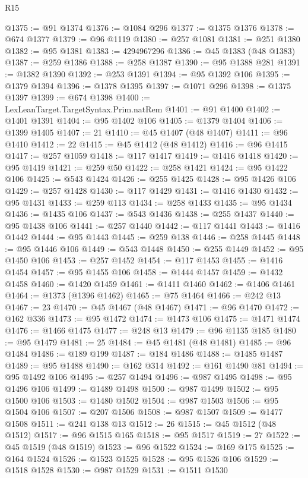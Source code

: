 \begin{lexlean}{R15}
\begin{coremodule}
{{{{{{{{{{{{{{{{{{{{{{{{{{{{{{{{{{{{{{{{{{{{{{{{{{{{{{{{{{{{{{{{{{{{{{@1375 := @91 @1374
@1376 := @1084 @296
@1377 := @1375 @1376
@1378 := @674 @1377
@1379 := @96 @1119
@1380 := @257 @1081
@1381 := @251 @1380
@1382 := @95 @1381
@1383 := 4294967296
@1386 := @45 @1383 (@48 @1383)
@1387 := @259 @1386
@1388 := @258 @1387
@1390 := @95 @1388 @281
@1391 := @1382 @1390
@1392 := @253 @1391
@1394 := @95 @1392 @106
@1395 := @1379 @1394
@1396 := @1378 @1395
@1397 := @1071 @296
@1398 := @1375 @1397
@1399 := @674 @1398
@1400 := LexLeanTarget.TargetSyntax.Prim.natRem
@1401 := @91 @1400
@1402 := @1401 @1391
@1404 := @95 @1402 @106
@1405 := @1379 @1404
@1406 := @1399 @1405
@1407 := 21
@1410 := @45 @1407 (@48 @1407)
@1411 := @96 @1410
@1412 := 22
@1415 := @45 @1412 (@48 @1412)
@1416 := @96 @1415
@1417 := @257 @1059
@1418 := @117 @1417
@1419 := @1416 @1418
@1420 := @95 @1419
@1421 := @259 @50
@1422 := @258 @1421
@1424 := @95 @1422 @106
@1425 := @543 @1424
@1426 := @255 @1425
@1428 := @95 @1426 @106
@1429 := @257 @1428
@1430 := @117 @1429
@1431 := @1416 @1430
@1432 := @95 @1431
@1433 := @259 @113
@1434 := @258 @1433
@1435 := @95 @1434
@1436 := @1435 @106
@1437 := @543 @1436
@1438 := @255 @1437
@1440 := @95 @1438 @106
@1441 := @257 @1440
@1442 := @117 @1441
@1443 := @1416 @1442
@1444 := @95 @1443
@1445 := @259 @138
@1446 := @258 @1445
@1448 := @95 @1446 @106
@1449 := @543 @1448
@1450 := @255 @1449
@1452 := @95 @1450 @106
@1453 := @257 @1452
@1454 := @117 @1453
@1455 := @1416 @1454
@1457 := @95 @1455 @106
@1458 := @1444 @1457
@1459 := @1432 @1458
@1460 := @1420 @1459
@1461 := @1411 @1460
@1462 := @1406 @1461
@1464 := @1373 (@1396 @1462)
@1465 := @75 @1464
@1466 := @242 @13
@1467 := 23
@1470 := @45 @1467 (@48 @1467)
@1471 := @96 @1470
@1472 := @162 @336
@1473 := @95 @1472
@1474 := @1473 @106
@1475 := @1471 @1474
@1476 := @1466 @1475
@1477 := @248 @13
@1479 := @96 @1135 @185
@1480 := @95 @1479
@1481 := 25
@1484 := @45 @1481 (@48 @1481)
@1485 := @96 @1484
@1486 := @189 @199
@1487 := @184 @1486
@1488 := @1485 @1487
@1489 := @95 @1488
@1490 := @162 @314
@1492 := @161 @1490 @81
@1494 := @95 @1492 @106
@1495 := @257 @1494
@1496 := @987 @1495
@1498 := @95 @1496 @106
@1499 := @1489 @1498
@1500 := @987 @1499
@1502 := @95 @1500 @106
@1503 := @1480 @1502
@1504 := @987 @1503
@1506 := @95 @1504 @106
@1507 := @207 @1506
@1508 := @987 @1507
@1509 := @1477 @1508
@1511 := @241 @138 @13
@1512 := 26
@1515 := @45 @1512 (@48 @1512)
@1517 := @96 @1515 @165
@1518 := @95 @1517
@1519 := 27
@1522 := @45 @1519 (@48 @1519)
@1523 := @96 @1522
@1524 := @169 @175
@1525 := @164 @1524
@1526 := @1523 @1525
@1528 := @95 @1526 @106
@1529 := @1518 @1528
@1530 := @987 @1529
@1531 := @1511 @1530
}}}}}}}}}}}}}}}}}}}}}}}}}}}}}}}}}}}}}}}}}}}}}}}}}}}}}}}}}}}}}}}}}}}}}}
\end{coremodule}
\end{lexlean}
